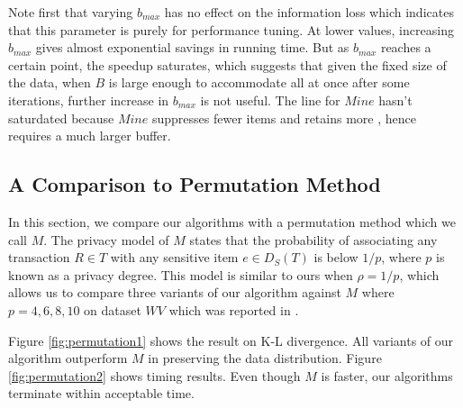 Note first that varying $b_{max}$ has no effect on
the information loss which
indicates that this parameter is purely for performance tuning.
At lower values, increasing $b_{max}$ gives almost exponential
savings in running time. But as $b_{max}$ reaches a certain point, the speedup
saturates, which suggests that given the fixed size of the data,
when $B$ is large enough to accommodate all \qids at once after some iterations,
further increase in $b_{max}$ is not useful.
The line for $Mine$ hasn't saturdated because $Mine$ suppresses
fewer items and retains more \qids, hence requires a much larger
buffer.

\subsection{A Comparison to Permutation Method}
In this section, we compare our algorithms with a permutation method
\cite{2011:TKDE:Anonymous}
which we call $M$.
The privacy model of $M$
states that the probability of associating any transaction $R \in T$ with
any sensitive item $e \in D_S(T)$ is below $1/p$, where $p$ is known as
a privacy degree. This model is similar to ours when $\rho = 1/p$,
which allows us to compare three variants of our algorithm against
$M$ where $p=4, 6, 8, 10$ on dataset $WV$ which was reported in
\cite{2011:TKDE:Anonymous}.

Figure \ref{fig:permutation1} shows the result on K-L divergence.
All variants of our algorithm outperform $M$ in
preserving the data distribution. Figure \ref{fig:permutation2} shows timing results. Even though $M$ is faster, our algorithms
terminate within acceptable time.

